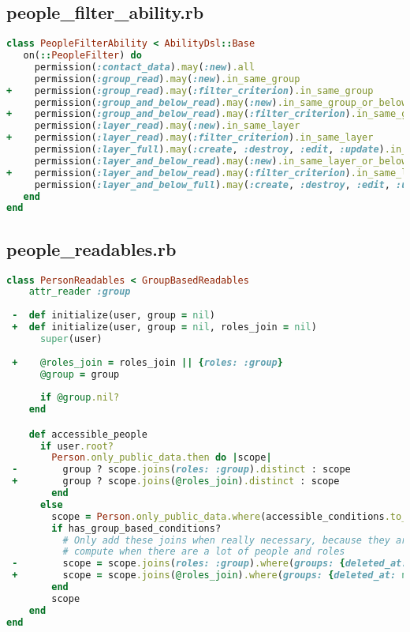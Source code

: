 \subsection{people\_filter\_ability.rb}
\begin{lstlisting}[language=Ruby]
class PeopleFilterAbility < AbilityDsl::Base
   on(::PeopleFilter) do
     permission(:contact_data).may(:new).all
     permission(:group_read).may(:new).in_same_group
+    permission(:group_read).may(:filter_criterion).in_same_group
     permission(:group_and_below_read).may(:new).in_same_group_or_below
+    permission(:group_and_below_read).may(:filter_criterion).in_same_group_or_below
     permission(:layer_read).may(:new).in_same_layer
+    permission(:layer_read).may(:filter_criterion).in_same_layer
     permission(:layer_full).may(:create, :destroy, :edit, :update).in_same_layer
     permission(:layer_and_below_read).may(:new).in_same_layer_or_below
+    permission(:layer_and_below_read).may(:filter_criterion).in_same_layer_or_below
     permission(:layer_and_below_full).may(:create, :destroy, :edit, :update).in_same_layer_or_below
   end
end
\end{lstlisting}

\subsection{people\_readables.rb}
\begin{lstlisting}[language=Ruby]
class PersonReadables < GroupBasedReadables
    attr_reader :group
  
 -  def initialize(user, group = nil)
 +  def initialize(user, group = nil, roles_join = nil)
      super(user)
  
 +    @roles_join = roles_join || {roles: :group}
      @group = group
  
      if @group.nil?
    end

    def accessible_people
      if user.root?
        Person.only_public_data.then do |scope|
 -        group ? scope.joins(roles: :group).distinct : scope
 +        group ? scope.joins(@roles_join).distinct : scope
        end
      else
        scope = Person.only_public_data.where(accessible_conditions.to_a).distinct
        if has_group_based_conditions?
          # Only add these joins when really necessary, because they are extremely expensive to
          # compute when there are a lot of people and roles
 -        scope = scope.joins(roles: :group).where(groups: {deleted_at: nil})
 +        scope = scope.joins(@roles_join).where(groups: {deleted_at: nil})
        end
        scope
    end
end    
\end{lstlisting}

